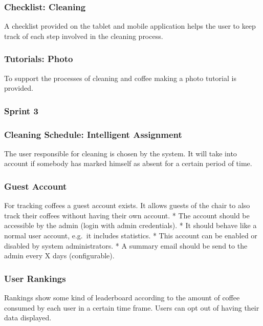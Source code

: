 \subsubsection*{Checklist: Cleaning}

A checklist provided on the tablet and mobile application helps the user
to keep track of each step involved in the cleaning process.

\subsubsection*{Tutorials: Photo}

To support the processes of cleaning and coffee making a photo tutorial
is provided.

\subsubsection{Sprint 3}\label{sprint-3}

\subsubsection*{Cleaning Schedule: Intelligent Assignment}

The user responsible for cleaning is chosen by the system. It will take
into account if somebody has marked himself as absent for a certain
period of time.

\subsubsection*{Guest Account}

For tracking coffees a guest account exists. It allows guests of the
chair to also track their coffees without having their own account. *
The account should be accessible by the admin (login with admin
credentials). * It should behave like a normal user account, e.g.~it
includes statistics. * This account can be enabled or disabled by system
administrators. * A summary email should be send to the admin every X
days (configurable).

\subsubsection*{User Rankings}

Rankings show some kind of leaderboard according to the amount of coffee
consumed by each user in a certain time frame. Users can opt out of
having their data displayed.

